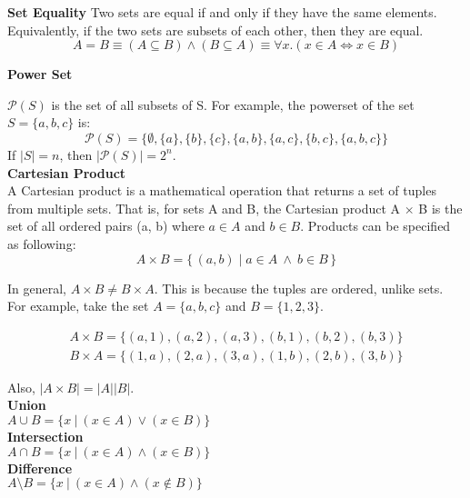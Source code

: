 \documentclass{article}
\numberwithin{theorem}{subsection}
\numberwithin{theorem}{subsubsection}
\theoremstyle{definition}
\numberwithin{definition}{subsection}
\numberwithin{definition}{subsubsection}
\begin{document}
\noindent \textbf{Set Equality}
\indent Two sets are equal if and only if they have the same elements. Equivalently, if the two sets are subsets of each other, then they are equal.
\begin{equation*}
    A = B \equiv (A \subseteq B) \land (B \subseteq A) \equiv \forall x.(x \in A \iff x \in B)
\end{equation*}

\noindent \textbf{Power Set}

$\mathcal{P}(S)$ is the set of all subsets of S. For example, the powerset of the set $S = \{a,b,c\}$ is:
\begin{equation*}
    \mathcal{P}(S) = \{\emptyset, \{a\}, \{b\}, \{c\}, \{a,b\}, \{a,c\}, \{b,c\}, \{a,b,c\}\}
\end{equation*}
\noindent If $|S| = n$, then $|\mathcal{P}(S)| = 2^{n}$. \\

\noindent \textbf{Cartesian Product} \\
\indent A Cartesian product is a mathematical operation that returns a set of tuples from multiple sets. That is, for sets A and B, the Cartesian product A $\times$ B is the set of all ordered pairs (a, b) where $a \in A$ and $b \in B$. Products can be specified as following:
\begin{equation*}
    A\times B = \{\,(a,b)\mid a\in A \ \land \ b\in B\,\}
\end{equation*}

\noindent In general, $A \times B \neq B \times A$. This is because the tuples are ordered, unlike sets. For example, take the set $A = \{a,b,c\}$ and $B = \{1,2,3\}$.

\begin{gather*}
    A \times B = \{(a,1),(a,2),(a,3),(b,1),(b,2),(b,3)\} \\
    B \times A = \{(1,a),(2,a),(3,a),(1,b),(2,b),(3,b)\}
\end{gather*}

\noindent Also, $|A \times B| = |A||B|$. \\

\noindent \textbf{Union} \\
\indent $A \cup B = \{x\ |\ (x \in A) \lor (x \in B)\}$ \\

\noindent \textbf{Intersection} \\
\indent $A \cap B = \{x\ |\ (x \in A) \land (x \in B)\}$ \\

\noindent \textbf{Difference} \\
\indent $A \setminus B = \{x\ |\ (x \in A) \land (x \notin B)\}$ \\
\end{document}
